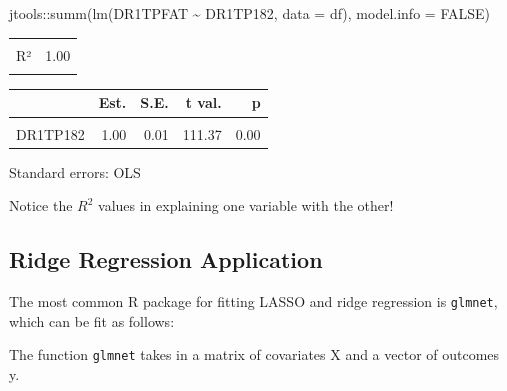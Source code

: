 \documentclass[
  letterpaper,
  DIV=11,
  numbers=noendperiod]{scrreport}
\newenvironment{Shaded}{\begin{snugshade}}{\end{snugshade}}
\newcommand{\AttributeTok}[1]{\textcolor[rgb]{0.40,0.45,0.13}{#1}}
\newcommand{\ConstantTok}[1]{\textcolor[rgb]{0.56,0.35,0.01}{#1}}
\newcommand{\FunctionTok}[1]{\textcolor[rgb]{0.28,0.35,0.67}{#1}}
\newcommand{\NormalTok}[1]{\textcolor[rgb]{0.00,0.23,0.31}{#1}}
\newcommand{\SpecialCharTok}[1]{\textcolor[rgb]{0.37,0.37,0.37}{#1}}
\begin{document}
\begin{Shaded}
\begin{Highlighting}[]
\NormalTok{jtools}\SpecialCharTok{::}\FunctionTok{summ}\NormalTok{(}\FunctionTok{lm}\NormalTok{(DR1TPFAT }\SpecialCharTok{\textasciitilde{}}\NormalTok{  DR1TP182, }\AttributeTok{data =}\NormalTok{ df), }\AttributeTok{model.info =} \ConstantTok{FALSE}\NormalTok{)}
\end{Highlighting}
\end{Shaded}

\begin{table}[!h]
\centering
\begin{tabular}{lr}
\toprule
\cellcolor{gray!6}{F(1,48)} & \cellcolor{gray!6}{12403.15}\\
R² & 1.00\\
\cellcolor{gray!6}{Adj. R²} & \cellcolor{gray!6}{1.00}\\
\bottomrule
\end{tabular}
\end{table} \begin{table}[!h]
\centering
\begin{threeparttable}
\begin{tabular}{lrrrr}
\toprule
  & Est. & S.E. & t val. & p\\
\midrule
\cellcolor{gray!6}{(Intercept)} & \cellcolor{gray!6}{-0.00} & \cellcolor{gray!6}{0.01} & \cellcolor{gray!6}{-0.00} & \cellcolor{gray!6}{1.00}\\
DR1TP182 & 1.00 & 0.01 & 111.37 & 0.00\\
\bottomrule
\end{tabular}
\begin{tablenotes}
\item Standard errors: OLS
\end{tablenotes}
\end{threeparttable}
\end{table}

Notice the \(R^2\) values in explaining one variable with the other!

\hypertarget{ridge-regression-application}{%
\subsection{Ridge Regression
Application}\label{ridge-regression-application}}

The most common R package for fitting LASSO and ridge regression is
\texttt{glmnet}, which can be fit as follows:

The function \texttt{glmnet} takes in a matrix of covariates X and a
vector of outcomes y.
\end{document}
